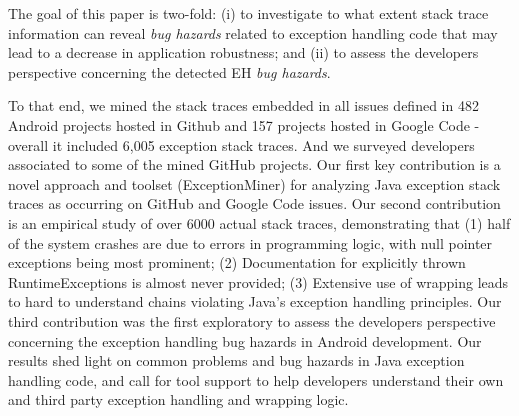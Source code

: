 The goal of this paper is two-fold: (i) to investigate 
to what extent stack trace information can reveal \emph{bug hazards} 
related to exception handling code that may lead to a decrease in
application robustness; and (ii) to assess the developers perspective
concerning the detected EH \emph{bug hazards}. 

To that end, we mined the stack 
traces embedded in all issues defined in 482 Android projects hosted in Github and 
157 projects hosted in Google Code - overall it included 6,005
exception stack traces. And we surveyed developers associated to some of 
the mined GitHub projects.
Our first key contribution is
a novel approach and toolset (ExceptionMiner) for analyzing Java
  exception stack traces as occurring on GitHub and Google Code
  issues.
Our second contribution is
an empirical study of over 6000 actual stack traces,
  demonstrating that (1) half of the system crashes are due to errors
  in programming logic, with null pointer exceptions being most
  prominent;
  (2) Documentation for explicitly thrown RuntimeExceptions is almost
  never provided; 
  (3) Extensive use of wrapping leads to hard to understand chains
  violating Java's exception handling principles.
Our third contribution was the first exploratory to assess the 
developers perspective concerning the exception handling 
bug hazards in Android development.
 Our results shed light on common problems and bug hazards in Java
exception handling code, and call for tool support to help developers
understand their own and third party exception handling and wrapping logic.






